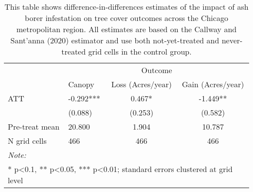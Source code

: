 \begin{table}[!h]

\caption{\label{tab:grid-tree-table}This table shows difference-in-differences estimates of the impact of ash borer infestation on tree cover outcomes across the Chicago metropolitan region. All estimates are based on the Callway and Sant'anna (2020) estimator and use both not-yet-treated and never-treated grid cells in the control group.}
\centering
\begin{tabular}[t]{llcc}
\toprule
\multicolumn{1}{c}{ } & \multicolumn{3}{c}{Outcome} \\
\cmidrule(l{3pt}r{3pt}){2-4}
  & Canopy & Loss (Acres/year) & Gain (Acres/year)\\
\midrule
ATT & -0.292*** & 0.467* & -1.449**\\
 & (0.088) & (0.253) & (0.582)\\
\midrule
Pre-treat mean & 20.800 & 1.904 & 10.787\\
N grid cells & 466 & 466 & 466\\
\bottomrule
\multicolumn{4}{l}{\rule{0pt}{1em}\textit{Note: }}\\
\multicolumn{4}{l}{\rule{0pt}{1em}* p<0.1, ** p<0.05, *** p<0.01; standard errors clustered at grid level}\\
\end{tabular}
\end{table}
